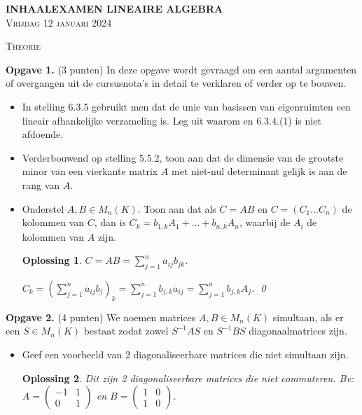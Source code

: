 \documentclass[a4paper,12pt]{article}
\newtheorem{oplossing}{Oplossing}
\begin{document}
\begin{enumerate}
\begin{center}
    \Large\textbf{INHAALEXAMEN LINEAIRE ALGEBRA} \\[0.5cm]
    \large\textsc{Vrijdag 12 januari 2024} \\[0.5cm]
\end{center}

\vspace{1cm}

\begin{center}
    \textsc{Theorie}
\end{center}

\textbf{Opgave 1.} (3 punten) In deze opgave wordt gevraagd om een aantal argumenten of overgangen uit de cursusnota's in detail te verklaren of verder op te bouwen.
\begin{itemize}
    \item[(i)] In stelling 6.3.5 gebruikt men dat de unie van basissen van eigenruimten een lineair afhankelijke verzameling is. Leg uit waarom en 6.3.4.(1) is niet afdoende.
    \item[(ii)] Verderbouwend op stelling 5.5.2, toon aan dat de dimensie van de grootste minor van een vierkante matrix $A$ met niet-nul determinant gelijk is aan de rang van $A$.
    \item[(iii)] Onderstel $A, B \in M_n(K)$. Toon aan dat als $C = AB$ en $C = (C_1 \dots C_n)$ de kolommen van $C$, dan is $C_k = b_{1,k}A_1 + \dots + b_{n,k}A_n$, waarbij de $A_i$ de kolommen van $A$ zijn.
    \begin{oplossing}
        \(C = AB = \sum_{j=1}^{n} a_{ij}b_{jk}\).

        \(C_k
        = \left(\sum_{j=1}^{n} a_{ij}b_{j}\right)_k
        = \sum_{j=1}^{n} b_{j,k}a_{ij}
        = \sum_{j=1}^{n} b_{j,k}A_j\). \qed
    \end{oplossing}
\end{itemize}

\vspace{0.5cm}

\textbf{Opgave 2.} (4 punten) We noemen matrices $A, B \in M_n(K)$ simultaan, als er een $S \in M_n(K)$ bestaat zodat zowel $S^{-1}AS$ en $S^{-1}BS$ diagonaalmatrices zijn.
\begin{itemize}
    \item[(i)] Geef een voorbeeld van 2 diagonaliseerbare matrices die niet simultaan zijn.
    \begin{oplossing}
        Dit zijn 2 diagonaliseerbare matrices die niet commuteren.
        Bv:
        \(
        A = \begin{pmatrix}
            -1 & 1 \\
            0 & 1
        \end{pmatrix}
        \)
        en
        \(
        B = \begin{pmatrix}
            1 & 0 \\
            1 & 0
        \end{pmatrix}
        \).


\end{oplossing}
\end{itemize}
\end{enumerate}
\end{document}
